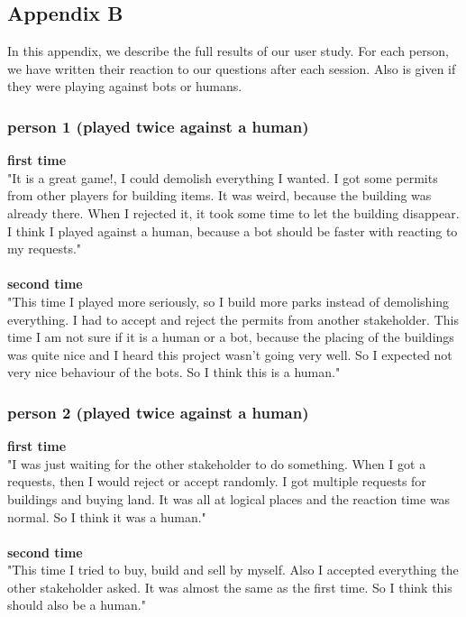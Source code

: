 \subsection{Appendix B}
In this appendix, we describe the full results of our user study. For each person, we have written their reaction to our questions after each session. Also is given if they were playing against bots or humans.
\subsubsection{person 1 (played twice against a human)}
\textbf{first time}\\
"It is a great game!, I could demolish everything I wanted. I got some permits from other players for building items. It was weird, because the building was already there. When I rejected it, it took some time to let the building disappear. I think I played against a human, because a bot should be faster with reacting to my requests."
\\ \\
\textbf{second time}\\
"This time I played more seriously, so I build more parks instead of demolishing everything. I had to accept and reject the permits from another stakeholder. This time I am not sure if it is a human or a bot, because the placing of the buildings was quite nice and I heard this project wasn't going very well. So I expected not very nice behaviour of the bots. So I think this is a human."

\subsubsection{person 2 (played twice against a human)}
\textbf{first time}\\
"I was just waiting for the other stakeholder to do something. When I got a requests, then I would reject or accept randomly. I got multiple requests for buildings and buying land. It was all at logical places and the reaction time was normal. So I think it was a human."
\\ \\
\textbf{second time}\\
"This time I tried to buy, build and sell by myself. Also I accepted everything the other stakeholder asked. It was almost the same as the first time. So I think this should also be a human."

